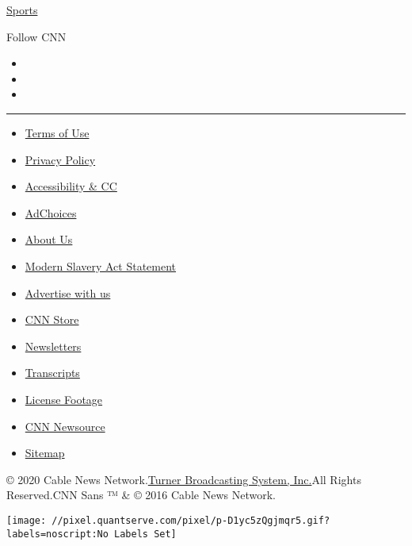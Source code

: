 \href{/sport}{Sports}

Follow CNN

\begin{itemize}
\item
\item
\item
\end{itemize}

\begin{center}\rule{0.5\linewidth}{\linethickness}\end{center}

\begin{itemize}
\tightlist
\item
  \href{/terms}{Terms of Use}
\item
  \href{/privacy}{Privacy Policy}
\item
  \href{/accessibility}{Accessibility \& CC}
\item
  \protect\hyperlink{}{AdChoices}
\item
  \href{/about}{About Us}
\item
  \href{/msa}{Modern Slavery Act Statement}
\item
  \href{https://commercial.cnn.com}{Advertise with us}
\item
  \href{//store.cnn.com}{CNN Store}
\item
  \href{/newsletters}{Newsletters}
\item
  \href{/transcripts}{Transcripts}
\item
  \href{/collection}{License Footage}
\item
  \href{http://cnnnewsource.com}{CNN Newsource}
\item
  \href{https://www.cnn.com/sitemap.html}{Sitemap}
\end{itemize}

© 2020 Cable News Network.\href{//www.turner.com}{Turner Broadcasting
System, Inc.}All Rights Reserved.CNN Sans ™ \& © 2016 Cable News
Network.

\texttt{[image: //pixel.quantserve.com/pixel/p-D1yc5zQgjmqr5.gif?labels=noscript:No Labels Set]}
